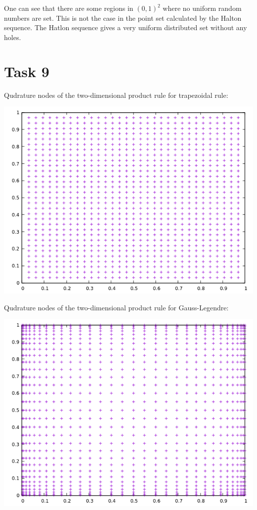 \documentclass[10pt,a4paper]{article}
\begin{document}
One can see that there are some regions in $(0,1)^2$ where no uniform random numbers are set. This is not the case in the point set calculated by the Halton sequence. The Hatlon sequence gives a very uniform distributed set without any holes.

\section*{Task 9}

Qudrature nodes of the two-dimensional product rule for trapezoidal rule:
\begin{center}
\includegraphics[scale=0.5]{quadrature_nodes_trapezoidal_rule.png}		
\end{center}

Qudrature nodes of the two-dimensional product rule for Gauss-Legendre:
\begin{center}
\includegraphics[scale=0.5]{quadrature_nodes_gauss_legendre.png}		
\end{center}
\end{document}
